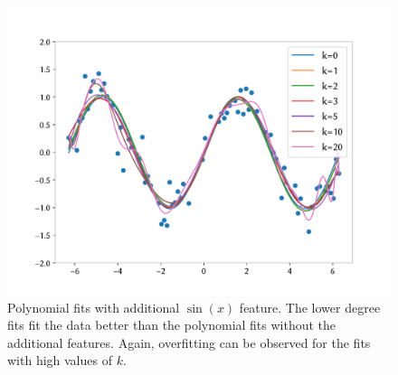 \begin{answer}
    \begin{figure}[h]
        \centering
        \includegraphics*[width=.7\linewidth]{../src/featuremaps/part_d.pdf}
        \caption{Polynomial fits with additional $\sin(x)$ feature. The lower degree fits fit the data better than the polynomial fits without the additional features.
        Again, overfitting can be observed for the fits with high values of $k$.}        
        \end{figure}
\end{answer}

